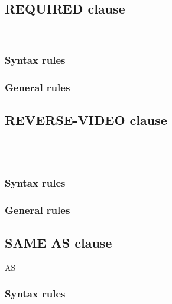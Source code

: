 \subsection{REQUIRED clause}

\begin{syntax}
  \begin{1=}
     \\
  \end{1=}
\end{syntax}

\subsubsection{Syntax rules}

\subsubsection{General rules}

\subsection{REVERSE-VIDEO clause}

\begin{syntax}
  \begin{1=}
     \\
     \\
  \end{1=}
\end{syntax}

\subsubsection{Syntax rules}

\subsubsection{General rules}

\subsection{SAME AS clause}

\begin{syntax}
   AS \identifier
\end{syntax}

\subsubsection{Syntax rules}

